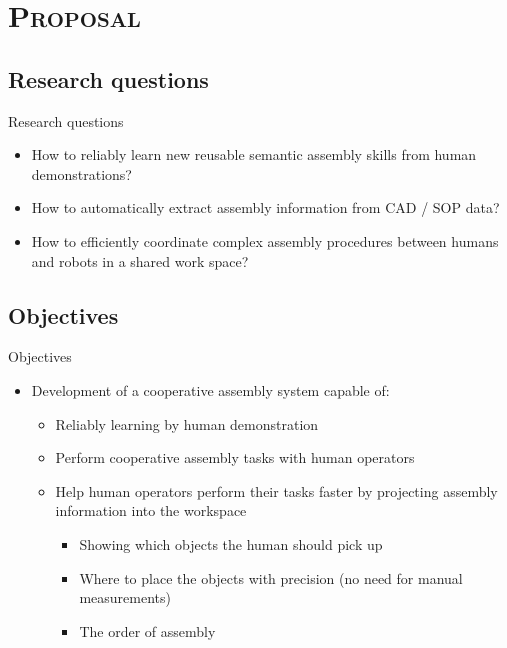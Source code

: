 \section{\scshape Proposal}\label{sec:proposal}

\subsection{Research questions}
\begin{frame}{Research questions}
	\begin{itemize}
		\item How to reliably learn new reusable semantic assembly skills from human demonstrations?
		\item How to automatically extract assembly information from CAD / SOP data?
		\item How to efficiently coordinate complex assembly procedures between humans and robots in a shared work space?
	\end{itemize}
\end{frame}

\subsection{Objectives}
\begin{frame}{Objectives}
	\begin{itemize}
		\item Development of a cooperative assembly system capable of:
		\begin{itemize}
			\item Reliably learning by human demonstration
			\item Perform cooperative assembly tasks with human operators
			\item Help human operators perform their tasks faster by projecting assembly information into the workspace
			\begin{itemize}
				\item Showing which objects the human should pick up
				\item Where to place the objects with precision (no need for manual measurements)
				\item The order of assembly
			\end{itemize}
		\end{itemize}

	\end{itemize}
\end{frame}

